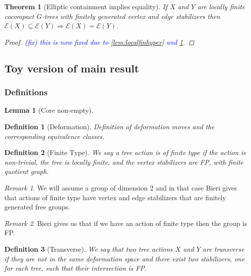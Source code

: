 \documentclass{article}
\newcommand{\fix}[1]{\textcolor{blue}{(fix) #1}}
\theoremstyle{mystyle}
\newtheorem{thm}{Theorem}[section]
\newtheorem{lem}{Lemma}[section]
\newtheorem{defn}{Definition}
\theoremstyle{remark}
\newtheorem{rmk}{Remark}[section]
\begin{document}
\begin{thm}
    [Elliptic containment implies equality]
    \label{thm:ellipticimpliesequality} 
    If \(X\) and \(Y\) are locally finite cocompact \(G\)-trees with finitely generated vertex and edge stabilizers then \(\mathcal{E}(X) \subseteq \mathcal{E}(Y) \Longrightarrow \mathcal{E}(X) = \mathcal{E}(Y) \). 
    \begin{proof}
        \fix{this is now fixed due to \ref{lem:localfinhyper} and \ref{thm:ellipticimpliesequality}.}
    \end{proof}
\end{thm}






\subsection{Toy version of main result}


\subsubsection{Definitions}

\begin{lem}
    [Core non-empty]
    \label{lem:nonempty} 
\end{lem}

\begin{defn}
    [Deformation]
    \label{defn:deformation} 
    Definition of deformation moves and the corresponding equivalence classes.
\end{defn}

\begin{defn}[Finite Type]
    \label{defn:finitetype} 
We say a tree action is of \emph{finite type} if the action is non-trivial, the tree is locally finite, and the vertex stabilizers are FP, with finite quotient graph.
\end{defn}

\begin{rmk}
    We will assume a group of dimension 2 and in that case Bieri gives that actions of finite type have vertex and edge stabilizers that are finitely generated free groups.
\end{rmk}

\begin{rmk}
    Bieri gives us that if we have an action of finite type then the group is FP.
\end{rmk}

\begin{defn}[Transverse]
    \label{defn:transverse} 
    We say that two tree actions $X$ and $Y$ are \emph{transverse} if they are not in the same deformation space and there exist two stabilizers, one for each tree, such that their intersection is FP.
\end{defn}
\end{document}

